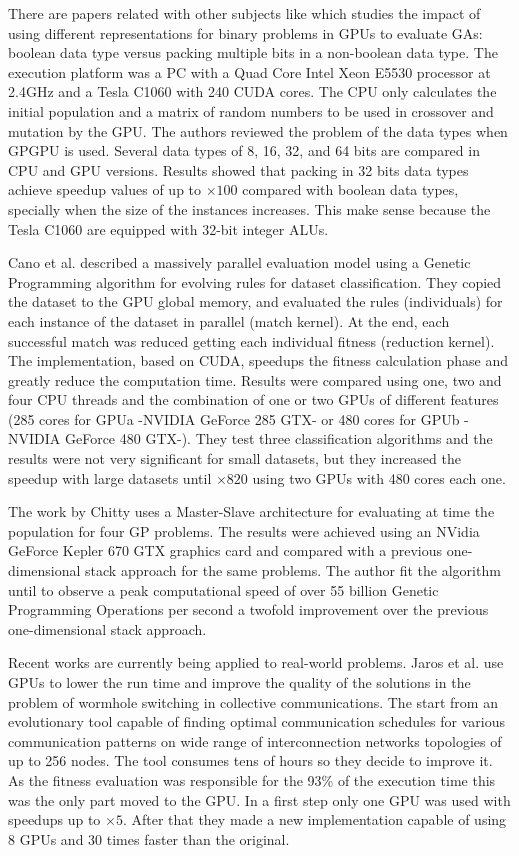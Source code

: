 \documentclass{article}
\begin{document}
There are papers related with other subjects %
like \cite{Pedemonte:2011:BOG:2001858.2002031} which studies the impact of using different representations for binary problems in GPUs to evaluate GAs: boolean data type versus packing multiple bits in a non-boolean data type. The execution platform was a PC with a Quad Core Intel Xeon E5530 processor at 2.4GHz and a Tesla C1060 with 240 CUDA cores. The CPU only calculates the initial population and a matrix of random numbers to be used in crossover and mutation by the GPU. The authors reviewed the problem of the data types when GPGPU is used. Several data types of 8, 16, 32, and 64 bits are compared in CPU and GPU versions. Results showed that packing in 32 bits data types achieve speedup values of up to $\times100$ compared with boolean data types, specially when the size
of the instances increases. This make sense because the Tesla C1060
are equipped with 32-bit integer ALUs.

Cano et al. \cite{SpeedingTheEvaluationofGPCano:2012} described a massively parallel evaluation model using a Genetic Programming algorithm for evolving rules for dataset classification. They copied the dataset to the GPU global memory, and evaluated the rules (individuals) for each instance of the dataset in parallel (match kernel). At the end, each successful match was reduced getting each individual fitness (reduction kernel). The implementation, based on CUDA, speedups the fitness calculation phase and greatly reduce the computation time. Results were compared using one, two and four CPU threads and the combination of one or two GPUs of different features (285 cores for GPUa -NVIDIA GeForce 285 GTX- or 480 cores for GPUb -NVIDIA GeForce 480 GTX-). They test three classification algorithms and the results were not very significant for small datasets, but they increased the speedup with large datasets until $\times820$ using two GPUs with 480 cores each one.

The work by Chitty \cite{Chitty16FastParallel} uses a Master-Slave architecture for evaluating at time the population for four GP problems. The results were achieved using an NVidia GeForce Kepler 670 GTX graphics card and compared with a previous one-dimensional stack approach for the same problems. The author fit the algorithm until to observe a peak computational speed of over 55 billion Genetic Programming Operations per second a twofold improvement over the previous one-dimensional stack approach.


Recent works are currently being applied to real-world problems. Jaros et al. \cite{Jaros14Wormhole} use GPUs to lower the run time and improve the quality of the solutions in the problem of wormhole switching in collective communications. The start from an evolutionary tool capable of finding optimal communication schedules for various communication patterns on wide range of interconnection networks topologies of up to 256 nodes. The tool consumes tens of hours so they decide to improve it. As the fitness evaluation was responsible for the 93\% of the execution time this was the only part moved to the GPU. In a first step only one GPU was used with speedups up to $\times5$. After that they made a new implementation capable of using 8 GPUs and 30 times faster than the original.
\end{document}
